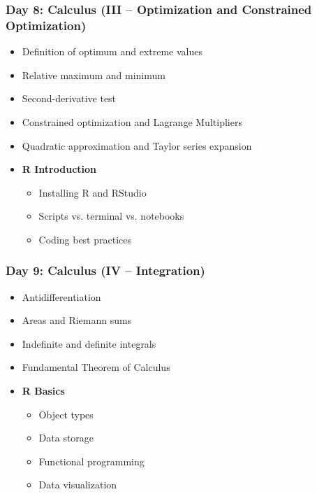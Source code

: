 \documentclass[12pt]{article}
\begin{document}
\subsubsection*{Day 8: Calculus (III -- Optimization and Constrained Optimization)}

\begin{itemize} \itemsep-0.35em
\item Definition of optimum and extreme values
\item Relative maximum and minimum
\item Second-derivative test
\item Constrained optimization and Lagrange Multipliers
\item Quadratic approximation and Taylor series expansion%
\item \textbf{R Introduction}
\begin{itemize}
  \item Installing R and RStudio
  \item Scripts vs. terminal vs. notebooks
  \item Coding best practices
\end{itemize}
\end{itemize}

\subsubsection*{Day 9: Calculus (IV -- Integration)}

\begin{itemize} \itemsep-0.35em
\item Antidifferentiation
\item Areas and Riemann sums
\item Indefinite and definite integrals
\item Fundamental Theorem of Calculus
\item \textbf{R Basics}
\begin{itemize}
  \item Object types
  \item Data storage
  \item Functional programming
  \item Data visualization
\end{itemize}
\end{itemize}
\end{document}

